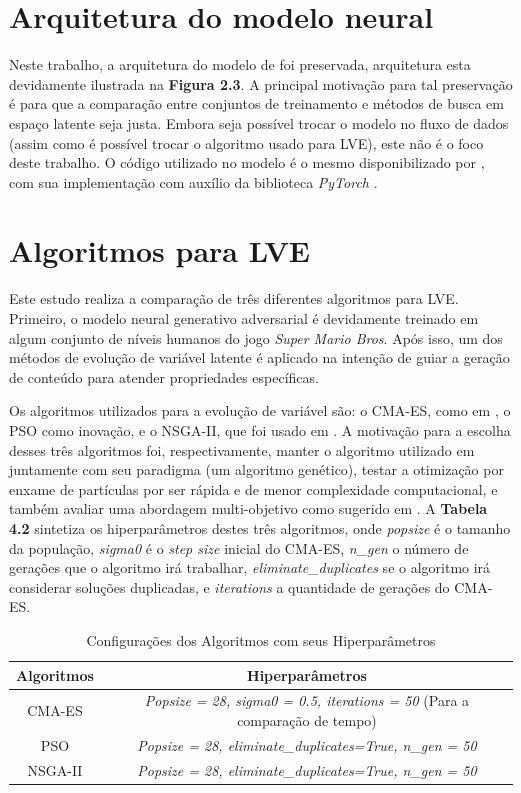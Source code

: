 \section{Arquitetura do modelo neural}

Neste trabalho, a arquitetura do modelo de \cite{marioGAN} foi preservada, arquitetura esta devidamente ilustrada na \textbf{Figura 2.3}. A principal motivação para tal preservação é para que a comparação entre conjuntos de treinamento e métodos de busca em espaço latente seja justa. Embora seja possível trocar o modelo no fluxo de dados (assim como é possível trocar o algoritmo usado para LVE), este não é o foco deste trabalho. O código utilizado no modelo é o mesmo disponibilizado por \cite{marioGAN}, com sua implementação com auxílio da biblioteca \textit{PyTorch} \cite{PyTorch}.

\section{Algoritmos para LVE}

Este estudo realiza a comparação de três diferentes algoritmos para LVE. Primeiro, o modelo neural generativo adversarial é devidamente treinado em algum conjunto de níveis humanos do jogo \textit{Super Mario Bros}. Após isso, um dos métodos de evolução de variável latente é aplicado na intenção de guiar a geração de conteúdo para atender propriedades específicas. 

Os algoritmos utilizados para a evolução de variável são: o CMA-ES, como em \cite{marioGAN}, o PSO como inovação, e o NSGA-II, que foi usado em \cite{cesagan}. A motivação para a escolha desses três algoritmos foi, respectivamente, manter o algoritmo utilizado em \cite{marioGAN} juntamente com seu paradigma (um algoritmo genético), testar a otimização por enxame de partículas por ser rápida e de menor complexidade computacional, e também avaliar uma abordagem multi-objetivo como sugerido em \cite{marioGAN}. A \textbf{Tabela 4.2} sintetiza os hiperparâmetros destes três algoritmos, onde \textit{popsize} é o tamanho da população, \textit{sigma0} é o \textit{step size} inicial do CMA-ES, \textit{n\_gen} o número de gerações que o algoritmo irá trabalhar, \textit{eliminate\_duplicates} se o algoritmo irá considerar soluções duplicadas, e \textit{iterations} a quantidade de gerações do CMA-ES. 

\begin{table}[h]
    \centering
    \begin{tabular}{|c|c|}
        \hline
        Algoritmos & Hiperparâmetros \\
        \hline
        CMA-ES & \textit{Popsize = 28, sigma0 = 0.5, iterations = 50} (Para a comparação de tempo) \\
        PSO & \textit{Popsize = 28, eliminate\_duplicates=True, n\_gen = 50} \\
        NSGA-II & \textit{Popsize = 28, eliminate\_duplicates=True, n\_gen = 50} \\
        \hline
    \end{tabular}
    \caption{Configurações dos Algoritmos com seus Hiperparâmetros}
    \label{tab:algoritmos}
\end{table}

